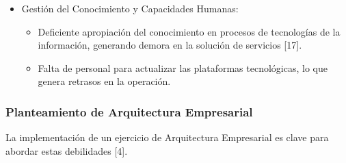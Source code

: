 \documentclass[
	a4paper, %
	12pt, %
]{include/CSSullivanBusinessReport}
\def\tightlist{}
\begin{document}
\begin{itemize}
  \begin{itemize}
  \tightlist
  \item
    Vulnerabilidad en la seguridad informática, que puede comprometer la
    integridad de los datos críticos y la continuidad operativa
    {[}14{]}.
  \item
    Vulneración de la inviolabilidad de acceso a cuentas de correo
    institucionales y aplicativos, afectando la reserva de la
    información {[}14{]}.
  \item
    Materialización de riesgos asociados a ataques cibernéticos,
    ingeniería social y suplantación de identidad, poniendo en riesgo la
    seguridad de la información y los documentos (pérdida de
    confidencialidad, integridad y disponibilidad) {[}16{]}.
  \end{itemize}
\item
  Gestión del Conocimiento y Capacidades Humanas:

  \begin{itemize}
  \tightlist
  \item
    Deficiente apropiación del conocimiento en procesos de tecnologías
    de la información, generando demora en la solución de servicios
    {[}17{]}.
  \item
    Falta de personal para actualizar las plataformas tecnológicas, lo
    que genera retrasos en la operación.
  \end{itemize}
\end{itemize}

\subsubsection{Planteamiento de Arquitectura
Empresarial}\label{sec:planteamiento-de-arquitectura-empresarial}

La implementación de un ejercicio de Arquitectura Empresarial es clave
para abordar estas debilidades {[}4{]}.
\end{document}
